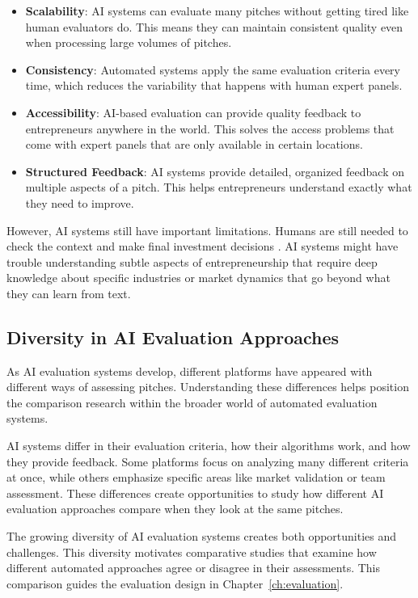 \begin{itemize}
    \item \textbf{Scalability}: AI systems can evaluate many pitches without getting tired like human evaluators do. This means they can maintain consistent quality even when processing large volumes of pitches.

    \item \textbf{Consistency}: Automated systems apply the same evaluation criteria every time, which reduces the variability that happens with human expert panels.

    \item \textbf{Accessibility}: AI-based evaluation can provide quality feedback to entrepreneurs anywhere in the world. This solves the access problems that come with expert panels that are only available in certain locations.

    \item \textbf{Structured Feedback}: AI systems provide detailed, organized feedback on multiple aspects of a pitch. This helps entrepreneurs understand exactly what they need to improve.
\end{itemize}

However, AI systems still have important limitations. Humans are still needed to check the context and make final investment decisions \cite{Steyvers2024}. AI systems might have trouble understanding subtle aspects of entrepreneurship that require deep knowledge about specific industries or market dynamics that go beyond what they can learn from text.

\subsection{Diversity in AI Evaluation Approaches}\label{subsec:ai-evaluation-diversity}
As AI evaluation systems develop, different platforms have appeared with different ways of assessing pitches. Understanding these differences helps position the comparison research within the broader world of automated evaluation systems.

AI systems differ in their evaluation criteria, how their algorithms work, and how they provide feedback. Some platforms focus on analyzing many different criteria at once, while others emphasize specific areas like market validation or team assessment. These differences create opportunities to study how different AI evaluation approaches compare when they look at the same pitches.

The growing diversity of AI evaluation systems creates both opportunities and challenges. This diversity motivates comparative studies that examine how different automated approaches agree or disagree in their assessments. This comparison guides the evaluation design in Chapter~\ref{ch:evaluation}.


